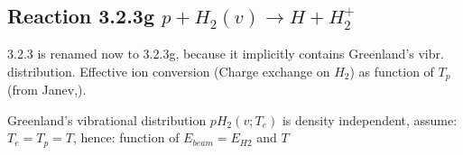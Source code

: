 \documentclass[12pt,dvipdfmx]{article}
\begin{document}
\subsection{
Reaction 3.2.3g  $  p + H_2(v) \rightarrow H + H_2^+  $
}


  3.2.3 is renamed now to 3.2.3g, because it
  implicitly contains Greenland's vibr. distribution.
  Effective ion conversion (Charge exchange on $H_2$)
  as function of $T_p$ (from Janev,\cite{kn:Janev}).

  Greenland's vibrational distribution $pH_2(v;T_e)$ is density independent,
  assume: $T_e = T_p = T$,
  hence: function of $E_{beam} = E_{H2}$ and $T$
\end{document}
